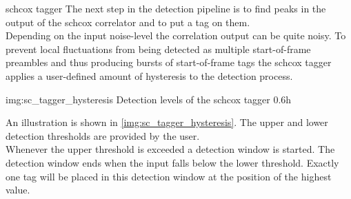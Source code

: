 \begin{subchapter}{\acrlong{schcox} tagger}
  The next step in the detection pipeline is to find peaks in
  the output of the \acrlong{schcox} correlator and to put
  a tag on them. \\

  Depending on the input noise-level the correlation output
  can be quite noisy. To prevent local fluctuations from being
  detected as multiple start-of-frame preambles and thus producing
  bursts of start-of-frame tags the \acrshort{schcox} tagger
  applies a user-defined amount of hysteresis to the detection
  process.

               {img:sc_tagger_hysteresis}
               {Detection levels of the \acrshort{schcox} tagger}
               {0.6}{h}

  An illustration is shown in \autoref{img:sc_tagger_hysteresis}.
  The upper and lower detection thresholds are provided by
  the user. \\

  Whenever the upper threshold is exceeded a detection window is started.
  The detection window ends when the input falls below the lower
  threshold.
  Exactly one tag will be placed in this detection window at
  the position of the highest value.
\end{subchapter}

